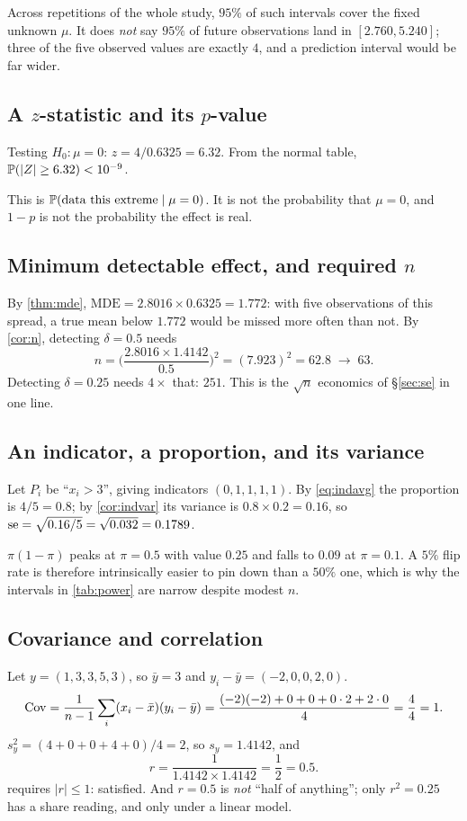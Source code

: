  Across repetitions of the whole study, $95\%$ of such
intervals cover the fixed unknown $\mu$. It does \emph{not} say $95\%$ of future
observations land in $[2.760,5.240]$; three of the five observed values are
exactly $4$, and a prediction interval would be far wider.

\subsection{A $z$-statistic and its $p$-value}
Testing $H_0:\mu=0$:
$z = 4/0.6325 = 6.32$. From the normal table, $\mathbb{P}(|Z|\ge 6.32) < 10^{-9}$.

 This is $\mathbb{P}(\text{data this extreme}\mid \mu=0)$. It
is not the probability that $\mu=0$, and $1-p$ is not the probability the effect
is real.

\subsection{Minimum detectable effect, and required $n$}
By \cref{thm:mde}, $\mathrm{MDE} = 2.8016 \times 0.6325 = 1.772$: with five
observations of this spread, a true mean below $1.772$ would be missed more often
than not. By \cref{cor:n}, detecting $\delta = 0.5$ needs
\[
n=\Big(\frac{2.8016 \times 1.4142}{0.5}\Big)^2=(7.923)^2=62.8 \;\to\; 63 .
\]
Detecting $\delta=0.25$ needs $4\times$ that: $251$. This is the $\sqrt n$ economics
of §\ref{sec:se} in one line.

\subsection{An indicator, a proportion, and its variance}
Let $P_i$ be ``$x_i > 3$'', giving indicators $(0,1,1,1,1)$. By \cref{eq:indavg}
the proportion is $4/5 = 0.8$; by \cref{cor:indvar} its variance is
$0.8 \times 0.2 = 0.16$, so
$\operatorname{se} = \sqrt{0.16/5} = \sqrt{0.032} = 0.1789$.

 $\pi(1-\pi)$ peaks at
$\pi=0.5$ with value $0.25$ and falls to $0.09$ at $\pi=0.1$. A $5\%$ flip rate
is therefore intrinsically easier to pin down than a $50\%$ one, which is why the
intervals in \cref{tab:power} are narrow despite modest $n$.

\subsection{Covariance and correlation}
Let $y=(1,3,3,5,3)$, so $\bar y = 3$ and $y_i - \bar y = (-2,0,0,2,0)$.
\[
\operatorname{Cov} = \frac{1}{n-1}\sum_i (x_i-\bar x)(y_i-\bar y)
=\frac{(-2)(-2)+0+0+0\cdot 2+2\cdot 0}{4}
=\frac{4}{4}=1 .
\]
$s_y^2 = (4+0+0+4+0)/4 = 2$, so $s_y=1.4142$, and
\[
r=\frac{1}{1.4142 \times 1.4142}=\frac{1}{2}=0.5 .
\]
 requires $|r|\le 1$: satisfied. And $r=0.5$ is \emph{not} ``half of
anything''; only $r^2=0.25$ has a share reading, and only under a linear model.

